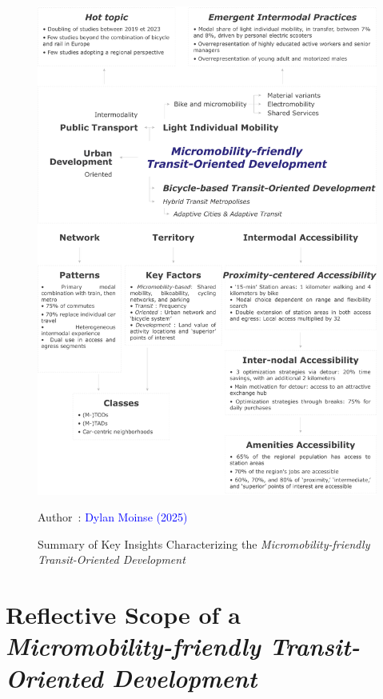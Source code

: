 \begin{refsegment}
    \begin{figure}[h!]\vspace*{4pt}
        \caption{Summary of Key Insights Characterizing the \textsl{Micromobility-friendly Transit-Oriented Development}}
        \label{fig-conclusion:synthese-enseignements}
        \centerline{\includegraphics[width=1\columnwidth]{src/Figures/Conclusion/EN_Conclusion_generale.pdf}}
        \vspace{5pt}
        \begin{flushright}\scriptsize{
        Author~: \textcolor{blue}{Dylan Moinse (2025)}
        }\end{flushright}
    \end{figure}

\section*{Reflective Scope of a \textsl{Micromobility-friendly Transit-Oriented Development}
    \label{conclusion-generale:portee-reflexive-mtod}
    }


\end{refsegment}
